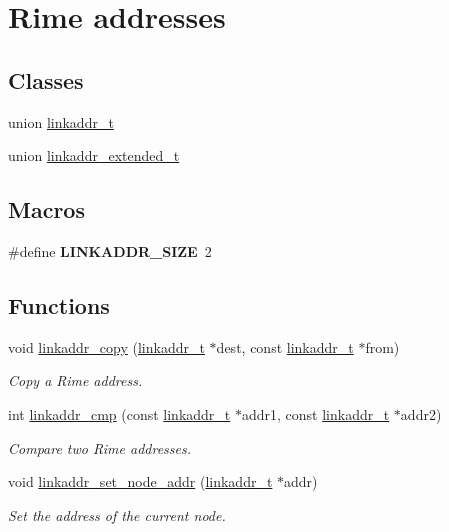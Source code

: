 \hypertarget{group__linkaddr}{}\section{Rime addresses}
\label{group__linkaddr}
\subsection*{Classes}
\begin{DoxyCompactItemize}
\item 
union \hyperlink{unionlinkaddr__t}{linkaddr\+\_\+t}
\item 
union \hyperlink{unionlinkaddr__extended__t}{linkaddr\+\_\+extended\+\_\+t}
\end{DoxyCompactItemize}
\subsection*{Macros}
\begin{DoxyCompactItemize}
\item 
\hypertarget{group__linkaddr_ga7d99de7749951ae439497bf8c33d73ec}{}\#define {\bfseries L\+I\+N\+K\+A\+D\+D\+R\+\_\+\+S\+I\+Z\+E}~2\label{group__linkaddr_ga7d99de7749951ae439497bf8c33d73ec}

\end{DoxyCompactItemize}
\subsection*{Functions}
\begin{DoxyCompactItemize}
\item 
void \hyperlink{group__linkaddr_ga61b6a33229787905999787d55047aa80}{linkaddr\+\_\+copy} (\hyperlink{unionlinkaddr__t}{linkaddr\+\_\+t} $\ast$dest, const \hyperlink{unionlinkaddr__t}{linkaddr\+\_\+t} $\ast$from)
\begin{DoxyCompactList}\small\item\em Copy a Rime address. \end{DoxyCompactList}\item 
int \hyperlink{group__linkaddr_gaaf0cefa6d20d20da33dfaf5098e7d16d}{linkaddr\+\_\+cmp} (const \hyperlink{unionlinkaddr__t}{linkaddr\+\_\+t} $\ast$addr1, const \hyperlink{unionlinkaddr__t}{linkaddr\+\_\+t} $\ast$addr2)
\begin{DoxyCompactList}\small\item\em Compare two Rime addresses. \end{DoxyCompactList}\item 
void \hyperlink{group__linkaddr_ga5ec363b4d4a855f1c6c3da284451415a}{linkaddr\+\_\+set\+\_\+node\+\_\+addr} (\hyperlink{unionlinkaddr__t}{linkaddr\+\_\+t} $\ast$addr)
\begin{DoxyCompactList}\small\item\em Set the address of the current node. \end{DoxyCompactList}\end{DoxyCompactItemize}

